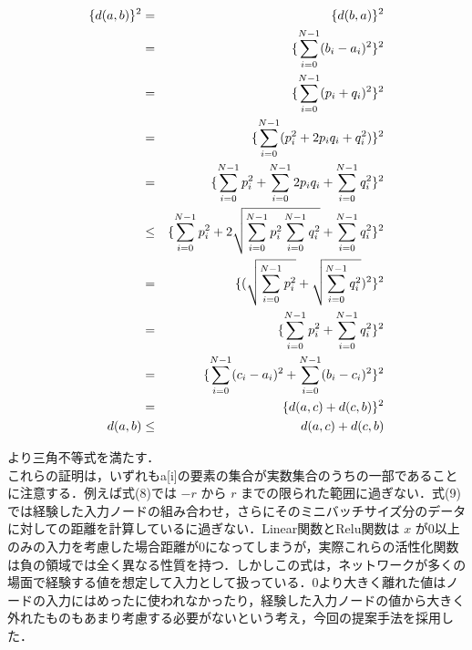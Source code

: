 \begin{enumerate}
    \begin{eqnarray}
        \{ d(a, b) \}^2 &=& \{ d(b, a) \}^2 \notag \\
        &=& \{ \sum_{i=0}^{N-1}(b_i - a_i)^2 \}^2 \notag \\
        &=& \{ \sum_{i=0}^{N-1}(p_i + q_i)^2 \}^2 \notag \\
        &=& \{ \sum_{i=0}^{N-1}(p_i^2 + 2p_iq_i + q_i^2) \}^2 \notag \\
        &=& \{ \sum_{i=0}^{N-1}p_i^2 + \sum_{i=0}^{N-1}2p_iq_i + \sum_{i=0}^{N-1}q_i^2 \}^2 \notag \\
        &\leq& \{ \sum_{i=0}^{N-1}p_i^2 + 2\sqrt{\sum_{i=0}^{N-1}p_i^2\sum_{i=0}^{N-1}q_i^2} + \sum_{i=0}^{N-1}q_i^2 \}^2 \notag \\
        &=& \{ (\sqrt{\sum_{i=0}^{N-1}p_i^2} + \sqrt{\sum_{i=0}^{N-1}q_i^2})^2 \}^2 \notag \\
        &=& \{ \sum_{i=0}^{N-1}p_i^2 + \sum_{i=0}^{N-1}q_i^2 \}^2 \notag \\
        &=& \{ \sum_{i=0}^{N-1}(c_i - a_i)^2 + \sum_{i=0}^{N-1}(b_i - c_i)^2 \}^2 \notag \\
        &=& \{ d(a, c) + d(c, b) \}^2 \notag \\
        d(a, b) &\leq& d(a, c) + d(c, b)
    \end{eqnarray}
\end{enumerate}

より三角不等式を満たす．\\

これらの証明は，いずれもa[i]の要素の集合が実数集合のうちの一部であることに注意する．例えば式(8)では $ -r $ から $ r $ までの限られた範囲に過ぎない．式(9)では経験した入力ノードの組み合わせ，さらにそのミニバッチサイズ分のデータに対しての距離を計算しているに過ぎない．Linear関数とRelu関数は $ x $ が0以上のみの入力を考慮した場合距離が0になってしまうが，実際これらの活性化関数は負の領域では全く異なる性質を持つ．しかしこの式は，ネットワークが多くの場面で経験する値を想定して入力として扱っている．0より大きく離れた値はノードの入力にはめったに使われなかったり，経験した入力ノードの値から大きく外れたものもあまり考慮する必要がないという考え，今回の提案手法を採用した．